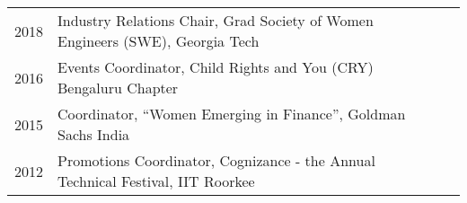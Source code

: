 \documentclass[]{deedy-resume-openfont}
\begin{document}
\begin{minipage}[t]{0.66\textwidth}
\begin{tabular}{rll}
2018 & Industry Relations Chair, Grad Society of Women Engineers (SWE), Georgia Tech \\                  
2016 & Events Coordinator, Child Rights and You (CRY) Bengaluru Chapter \\
2015 & Coordinator, “Women Emerging in Finance”, Goldman Sachs India \\
2012 & Promotions Coordinator, Cognizance - the Annual Technical Festival, IIT Roorkee\\
\end{tabular}
\sectionsep

\end{minipage} 
\end{document}
